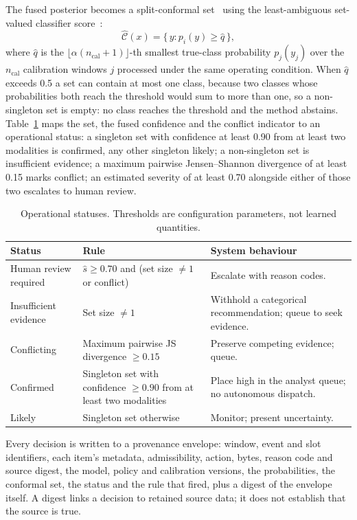 \documentclass[conference,a4paper]{IEEEtran}
\newif\ifsubmission
\newcommand{\masteronly}[1]{\ifsubmission\else#1\fi}
\newcommand{\mtab}[2]{\ifsubmission#2\else Table~\ref{#1}\fi}
\begin{document}
The fused posterior becomes a split-conformal set~\cite{vovk} using the least-ambiguous set-valued classifier score~\cite{sadinle}:
\begin{equation}
\label{eq:conformal}
\hat{\mathcal C}(x)=\{\,y: p_i(y)\ge\hat q\,\},
\end{equation}
where $\hat q$ is the $\lfloor \alpha(n_{\mathrm{cal}}+1)\rfloor$-th smallest true-class probability $p_j(y_j)$ over the $n_{\mathrm{cal}}$ calibration windows $j$ processed under the same operating condition. When $\hat q$ exceeds 0.5 a set can contain at most one class, because two classes whose probabilities both reach the threshold would sum to more than one, so a non-singleton set is empty: no class reaches the threshold and the method abstains. \mtab{tab:status}{A table in the package} maps the set, the fused confidence and the conflict indicator to an operational status: a singleton set with confidence at least 0.90 from at least two modalities is confirmed, any other singleton likely; a non-singleton set is insufficient evidence; a maximum pairwise Jensen--Shannon divergence of at least 0.15 marks conflict; an estimated severity of at least 0.70 alongside either of those two escalates to human review.

\masteronly{%
\begin{table}[t]
\caption{Operational statuses. Thresholds are configuration parameters, not learned quantities.}
\label{tab:status}
\centering\footnotesize
\begin{tabular}{@{}p{1.6cm}p{2.9cm}p{3.0cm}@{}}
\toprule
Status & Rule & System behaviour \\
\midrule
Human review required & $\hat s\ge0.70$ and (set size $\ne1$ or conflict) & Escalate with reason codes. \\
Insufficient evidence & Set size $\ne1$ & Withhold a categorical recommendation; queue to seek evidence. \\
Conflicting & Maximum pairwise JS divergence $\ge0.15$ & Preserve competing evidence; queue. \\
Confirmed & Singleton set with confidence $\ge0.90$ from at least two modalities & Place high in the analyst queue; no autonomous dispatch. \\
Likely & Singleton set otherwise & Monitor; present uncertainty. \\
\bottomrule
\end{tabular}
\end{table}}%


Every decision is written to a provenance envelope: window, event and slot identifiers, each item's metadata, admissibility, action, bytes, reason code and source digest, the model, policy and calibration versions, the probabilities, the conformal set, the status and the rule that fired, plus a digest of the envelope itself. A digest links a decision to retained source data; it does not establish that the source is true.
\end{document}
